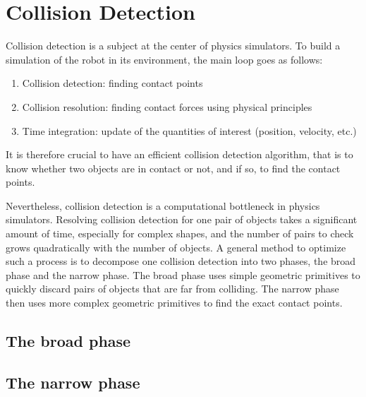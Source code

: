 \section{Collision Detection}
Collision detection is a subject at the center of physics simulators. To build a simulation of the robot in its environment, the main loop goes as follows:
\begin{enumerate}
    \item Collision detection: finding contact points
    \item Collision resolution: finding contact forces using physical principles
    \item Time integration: update of the quantities of interest (position, velocity, etc.)
\end{enumerate}
It is therefore crucial to have an efficient collision detection algorithm, that is to know whether two objects are in contact or not, and if so, to find the contact points.

Nevertheless, collision detection is a computational bottleneck in physics simulators. Resolving collision detection for one pair of objects takes a significant amount of time, especially for complex shapes, and the number of pairs to check grows quadratically with the number of objects. A general method to optimize such a process is to decompose one collision detection into two phases, the broad phase and the narrow phase. The broad phase uses simple geometric primitives to quickly discard pairs of objects that are far from colliding. The narrow phase then uses more complex geometric primitives to find the exact contact points.

\subsection{The broad phase}

\subsection{The narrow phase}

\newpage